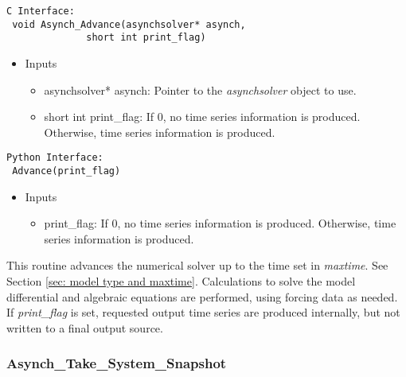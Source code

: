 \documentclass[12pt]{article}
\begin{document}
\begin{lstlisting}[style=CStyle]
 C Interface:
 void Asynch_Advance(asynchsolver* asynch,
		      short int print_flag)
\end{lstlisting}
\begin{itemize}
 \item Inputs
  \begin{itemize}
   \item asynchsolver* asynch: Pointer to the \emph{asynchsolver} object to use.
   \item short int print\_flag: If 0, no time series information is produced. Otherwise, time series information is produced.
  \end{itemize}
\end{itemize}
\begin{lstlisting}[style=PythonStyle]
 Python Interface:
 Advance(print_flag)
\end{lstlisting}
\begin{itemize}
 \item Inputs
  \begin{itemize}
   \item print\_flag: If 0, no time series information is produced. Otherwise, time series information is produced.
  \end{itemize}
\end{itemize}
This routine advances the numerical solver up to the time set in \emph{maxtime}. See Section \ref{sec: model type and maxtime}. Calculations to solve the model differential and algebraic equations are performed, using forcing data as needed. If \emph{print\_flag} is set, requested output time series are produced internally, but not written to a final output source.


\subsubsection{Asynch\_Take\_System\_Snapshot} \label{sec: asynch_take_system_snapshot}
\end{document}
